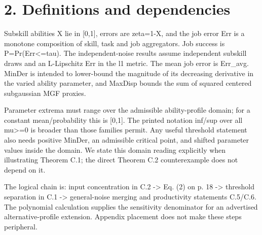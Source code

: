 \documentclass[10pt]{article}
\begin{document}
\section*{2. Definitions and dependencies}
Subskill abilities X lie in [0,1], errors are zeta=1-X, and the job error Err is a monotone composition of skill, task and job aggregators. Job success is P=Pr(Err<=tau). The independent-noise results assume independent subskill draws and an L-Lipschitz Err in the l1 metric. The mean job error is Err\_avg. MinDer is intended to lower-bound the magnitude of its decreasing derivative in the varied ability parameter, and MaxDisp bounds the sum of squared centered subgaussian MGF proxies.\par
Parameter extrema must range over the admissible ability-profile domain; for a constant mean/probability this is [0,1]. The printed notation inf/sup over all mu>=0 is broader than those families permit. Any useful threshold statement also needs positive MinDer, an admissible critical point, and shifted parameter values inside the domain. We state this domain reading explicitly when illustrating Theorem C.1; the direct Theorem C.2 counterexample does not depend on it.\par
The logical chain is: input concentration in C.2 -> Eq. (2) on p. 18 -> threshold separation in C.1 -> general-noise merging and productivity statements C.5/C.6. The polynomial calculation supplies the sensitivity denominator for an advertised alternative-profile extension. Appendix placement does not make these steps peripheral.\par
\end{document}
